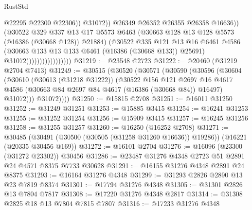 \begin{lexlean}{RustStd}
\begin{coremodule}
                                              @22295
                                              @22300
                                              @22306))
                                          @31072))
                                      @26349
                                      @26352
                                      @26355
                                      @26358
                                      @16636))
                                  (@30522
                                    @329
                                    @337
                                    @13
                                    @17
                                    @5573
                                    @6463
                                    (@30663 @128 @13 @128 @5573 (@16386 (@30668 @128)) @21884)
                                    (@30522
                                      @335
                                      @121
                                      @13
                                      @16
                                      @6461
                                      @4586
                                      (@30663 @133 @13 @133 @6461 (@16386 (@30668 @133)) @25691)
                                      @31072)))))))))))))))))
@31219 := @23548 @2723
@31222 := @20460 (@31219 @2704 @7413)
@31249 := @30515
    (@30520
      (@30571
        (@30590
          (@30596
            (@30604
              (@30610
                (@30613 (@31218 @31222))
                (@30522
                  @156
                  @121
                  @2697
                  @16
                  @4617
                  @4586
                  (@30663 @84 @2697 @84 @4617 (@16386 (@30668 @84)) @16497)
                  @31072)))
            @31072))))
@31250 := @15815 @2708
@31251 := @16011 @31250
@31252 := @31249 @31251
@31253 := @15885 @3415
@31254 := @16241 @31253
@31255 := @31252 @31254
@31256 := @15909 @3415
@31257 := @16245 @31256
@31258 := @31255 @31257
@31260 := @16250 (@16252 @2708)
@31271 := @30485
    (@30491 (@30500 (@30505 (@31258 @31260 @16636)) @19286))
    (@16221 (@20335 @30456 @169))
@31272 := @16101 @2704
@31276 := @16096 (@23300 (@31272 @23302)) @30456
@31286 := @23487 @31276 @4348 @2723 @51 @2891 @24 @4571 @8375 @7733 @30628
@31291 := @16155 @31276 @4348 @2891 @24 @8375
@31293 := @16164 @31276 @4348
@31299 := @31293 @2826 @2890 @13 @23 @7819 @8374
@31301 := @17794 @31276 @4348
@31305 := @31301 @2826 @13 @7804 @7817
@31308 := @17220 @31276 @4348 @2817
@31314 := @31308 @2825 @18 @13 @7804 @7815 @7807
@31316 := @17233 @31276 @4348

\end{coremodule}
\end{lexlean}
